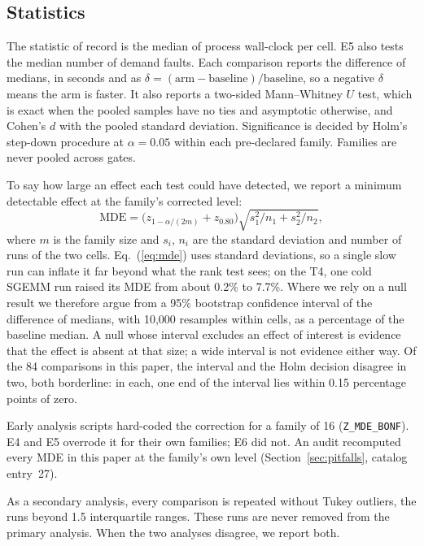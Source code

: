 \subsection{Statistics}
\label{sec:protocol:stats}

The statistic of record is the median of process wall-clock per cell.
E5 also tests the median number of demand faults. Each comparison
reports the difference of medians, in seconds and as
$\delta = (\text{arm} - \text{baseline})/\text{baseline}$, so a negative
$\delta$ means the arm is faster. It also reports a two-sided
Mann--Whitney $U$ test, which is exact when the pooled samples have no
ties and asymptotic otherwise, and Cohen's $d$ with the pooled standard
deviation. Significance is decided by Holm's step-down procedure at
$\alpha = 0.05$ within each pre-declared family. Families are never
pooled across gates.

To say how large an effect each test could have detected, we report a
minimum detectable effect at the family's corrected level:
\begin{equation}
\mathrm{MDE} = \bigl(z_{1-\alpha/(2m)} + z_{0.80}\bigr)
\sqrt{s_1^2/n_1 + s_2^2/n_2},
\label{eq:mde}
\end{equation}
where $m$ is the family size and $s_i$, $n_i$ are the standard deviation
and number of runs of the two cells. Eq.~(\ref{eq:mde}) uses standard deviations, so a single slow run
can inflate it far beyond what the rank test sees; on the T4, one cold
SGEMM run raised its MDE from about 0.2\% to 7.7\%. Where we rely on a null
result we therefore argue from a 95\% bootstrap confidence interval of the
difference of medians, with 10{,}000 resamples within cells, as a
percentage of the baseline median. A null whose interval excludes an effect
of interest is evidence that the effect is absent at that size; a wide
interval is not evidence either way. Of the 84 comparisons in this paper,
the interval and the Holm decision disagree in two, both borderline: in each, one end of the
interval lies within 0.15 percentage points of zero.

Early analysis scripts hard-coded the correction for a family of 16
(\texttt{Z\_MDE\_BONF}). E4 and E5 overrode it for their own families;
E6 did not. An audit recomputed every MDE in this paper at the family's
own level (Section~\ref{sec:pitfalls}, catalog entry~27).

As a secondary analysis, every comparison is repeated without Tukey
outliers, the runs beyond 1.5 interquartile ranges. These runs are never
removed from the primary analysis. When the two analyses disagree, we
report both.

